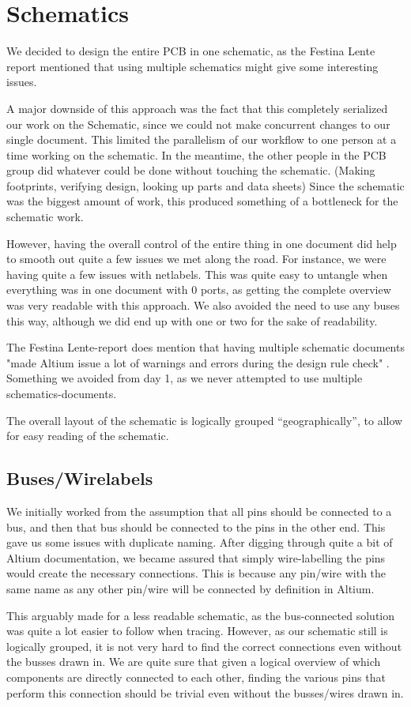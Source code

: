 \section {Schematics}

We decided to design the entire PCB in one schematic, as the Festina Lente
report mentioned that using multiple schematics might give
some interesting issues.

A major downside of this approach was the fact that this completely serialized
our work on the Schematic, since we could not make concurrent changes to our
single document. This limited the parallelism of our workflow to one person
at a time working on the schematic. 
In the meantime, the other people in the PCB group did whatever could be done 
without touching the schematic. (Making footprints, verifying design, looking up 
parts and data sheets) Since the schematic was the biggest amount of work, 
this produced something of a bottleneck for the schematic work.

However, having the overall control of the entire thing in one document
did help to smooth out quite a few issues we met along the road. For instance,
we were having quite a few issues with netlabels. This was quite easy to
untangle when everything was in one document with 0 ports, as getting the
complete overview was very readable with this approach. We also avoided the need
to use any buses this way, although we did end up with one or two for the sake
of readability.

The Festina Lente-report does mention that having multiple schematic
documents "made Altium issue a lot of warnings and errors during the design rule check"
. Something we avoided from day 1, as we never attempted to
use multiple schematics-documents.

The overall layout of the schematic is logically grouped ``geographically'', to
allow for easy reading of the schematic.

\subsection {Buses/Wirelabels}
We initially worked from the assumption that all pins should be connected to a
bus, and then that bus should be connected to the pins in the other end. This
gave us some issues with duplicate naming. After digging through quite a bit of
Altium documentation, we became assured that simply wire-labelling the pins
would create the necessary connections. This is because any pin/wire with the
same name as any other pin/wire will be connected by definition in Altium.

This arguably made for a less readable schematic, as the bus-connected solution
was quite a lot easier to follow when tracing. However, as our schematic still
is logically grouped, it is not very hard to find the correct connections even
without the busses drawn in. We are quite sure that given a logical overview of
which components are directly connected to each other, finding the various pins
that perform this connection should be trivial even without the busses/wires
drawn in.

